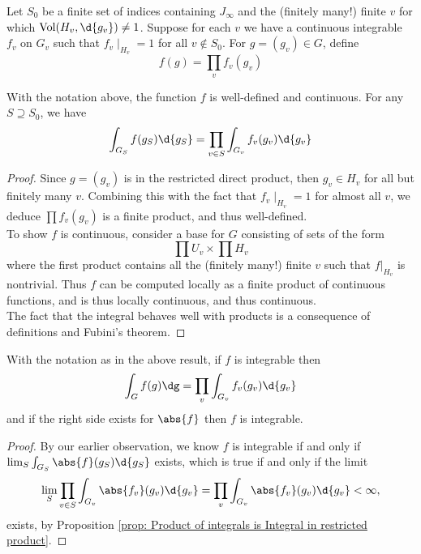 \documentclass[11pt, x11names, openany]{book}
\begin{document}
Let $S_0$ be a finite set of indices containing $J_\infty$ and the (finitely many!) finite $v$ for which $\vol(H_v, \d{g_v}) \neq 1$. Suppose for each $v$ we have a continuous integrable $f_v$ on $G_v$ such that $f_v \mid_{H_v} = 1$ for all $v \notin S_0$. For $g = (g_v) \in G$, define
\begin{equation*}
    f(g) = \prod_v f_v(g_v)
\end{equation*}
\begin{prop}
\label{prop: Product of integrals is Integral in restricted product}
With the notation above, the function $f$ is well-defined and continuous. For any $S \supseteq S_0$, we have
\begin{equation*}
    \int_{G_S}f(g_S)\d{g_S} = \prod_{v \in S} \int_{G_v}f_v(g_v)\d{g_v}
\end{equation*}
\end{prop}
\begin{proof}
Since $g = (g_v)$ is in the restricted direct product, then $g_v \in H_v$ for all but finitely many $v$. Combining this with the fact that $f_v \mid_{H_v} = 1$ for almost all $v$, we deduce $\prod f_v(g_v)$ is a finite product, and thus well-defined.\\
To show $f$ is continuous, consider a base for $G$ consisting of sets of the form
\begin{equation*}
    \prod U_v \times \prod H_v
\end{equation*}
where the first product contains all the (finitely many!) finite $v$ such that $f \vert_{H_v}$ is nontrivial. Thus $f$ can be computed locally as a finite product of continuous functions, and is thus locally continuous, and thus continuous.\\
The fact that the integral behaves well with products is a consequence of definitions and Fubini's theorem.
\end{proof}

\begin{corollary}
\label{cor: Product integral restricted product Corollary}
    With the notation as in the above result, if $f$ is integrable then 
    \begin{equation*}
        \int_G f(g) \dg = \prod_v \int_{G_v}f_v(g_v) \d{g_v}
    \end{equation*}
    and if the right side exists for $\abs{f}$ then $f$ is integrable.
\end{corollary}
\begin{proof}
By our earlier observation, we know $f$ is integrable if and only if $\lim_S \int_{G_S}\abs{f}(g_S)\d{g_S}$ exists, which is true if and only if the limit
\begin{equation*}
    \lim_S \prod_{v \in S}\int_{G_v}\abs{f_v}(g_v) \d{g_v} = \prod_{v} \int_{G_v} \abs{f_v}(g_v) \d{g_v} < \infty,
\end{equation*}
exists, by Proposition \ref{prop: Product of integrals is Integral in restricted product}.
\end{proof}
\end{document}

